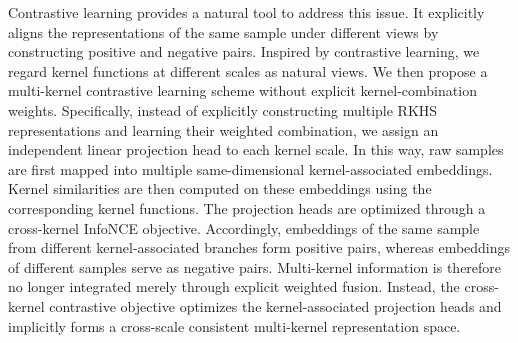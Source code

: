 \documentclass[times, review, 10pt]{elsarticle}
\begin{document}
Contrastive learning provides a natural tool to address this issue. It explicitly aligns the representations of the same sample under 
different views by constructing positive and negative pairs. Inspired by contrastive learning, we regard kernel functions 
at different scales as natural views. We then propose a multi-kernel contrastive learning scheme without explicit kernel-combination 
weights. Specifically, instead of explicitly constructing multiple RKHS representations and learning their weighted combination, we assign 
an independent linear projection head to each kernel scale. In this way, raw samples are first mapped into multiple same-dimensional 
kernel-associated embeddings. Kernel similarities are then computed on these embeddings using the corresponding kernel functions. The 
projection heads are optimized through a cross-kernel InfoNCE objective. Accordingly, embeddings of the same sample from different 
kernel-associated branches form positive pairs, whereas embeddings of different samples serve as negative pairs. Multi-kernel information 
is therefore no longer integrated merely through explicit weighted fusion. Instead, the cross-kernel contrastive objective optimizes the 
kernel-associated projection heads and implicitly forms a cross-scale consistent multi-kernel representation space.
\end{document}
